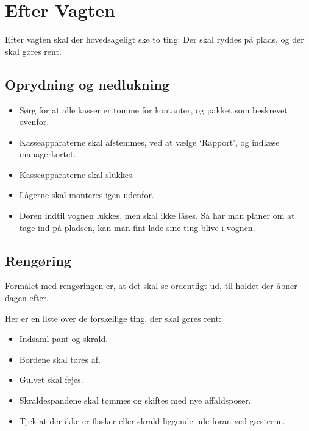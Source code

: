 \section{Efter Vagten}
\label{sec:post-barvagten}

Efter vagten skal der hovedsageligt ske to ting: Der skal ryddes på
plads, og der skal gøres rent.

\subsection{Oprydning og nedlukning}
\label{sec:post:oprydning}

\begin{itemize}
	\item Sørg for at alle kasser er tomme for kontanter, og pakket som beskrevet ovenfor.
	\item Kasseapparaterne skal afstemmes, ved at vælge `Rapport', og indlæse managerkortet.
	\item Kasseapparaterne skal slukkes.
	\item Lågerne skal monteres igen udenfor.
	\item Døren indtil vognen lukkes, men skal ikke låses. Så har man planer om at tage ind på pladsen, 
	kan man fint lade sine ting blive i vognen.
\end{itemize}

\subsection{Rengøring}
\label{sec:post:rengoring}

Formålet med rengøringen er, at det skal se ordentligt ud, til 
holdet der åbner dagen efter.

Her er en liste over de forskellige ting, der skal gøres rent:
\begin{itemize}
	\item Indsaml pant og skrald.
	\item Bordene skal tøres af.
	\item Gulvet skal fejes.
	\item Skraldespandene skal tømmes og skiftes med nye affaldsposer.
	\item Tjek at der ikke er flasker eller skrald liggende ude foran ved gæsterne.
\end{itemize}
